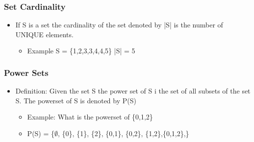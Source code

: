 \documentclass[11pt]{article}
\begin{document}
\subsubsection{Set Cardinality}
\label{sec-2-1-7}
\begin{itemize}

\item If S is a set the cardinality of the set denoted by |S| is the number of UNIQUE elements.
\label{sec-2-1-7-1}%
\begin{itemize}

\item Example S = \{1,2,3,3,4,4,5\} |S| = 5
\label{sec-2-1-7-1-1}%
\end{itemize} %
\end{itemize} %
\subsubsection{Power Sets}
\label{sec-2-1-8}
\begin{itemize}

\item Definition: Given the set S the power set of S i the set of all subsets of the set S. The powerset of S is denoted by P(S)
\label{sec-2-1-8-1}%
\begin{itemize}

\item Example: What is the powerset of \{0,1,2\}
\label{sec-2-1-8-1-1}%

\item P(S) = \{$\emptyset$, \{0\}, \{1\}, \{2\}, \{0,1\}, \{0,2\}, \{1,2\},\{0,1,2\},\}
\label{sec-2-1-8-1-2}%
\end{itemize} %
\end{itemize} %
\end{document}
